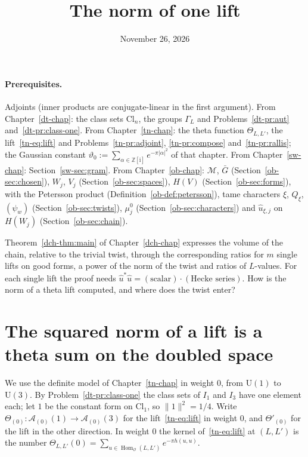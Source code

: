 \documentclass[reqno]{amsart}
\title{The norm of one lift}
\author{}
\date{November 26, 2026}
\newcounter{chap}
\theoremstyle{definition}
\theoremstyle{plain}
\newcommand{\Z}{\mathbb{Z}}
\newcommand{\ii}{\mathrm{i}}
\newcommand{\Oc}{\mathcal{O}}
\newcommand{\Ac}{\mathcal{A}}
\newcommand{\Mch}{\mathcal{M}}
\newcommand{\Cl}{\mathrm{Cl}}
\newcommand{\U}{\mathrm{U}}
\newcommand{\Hom}{\operatorname{Hom}}
\newcommand{\uh}{\hat u}
\begin{document}
\maketitle
{}\label{chap}

\paragraph{Prerequisites.}
Adjoints (inner products are conjugate-linear in the first argument).  From Chapter~\ref{dt-chap}: the class sets \(\Cl_n\), the groups \(\Gamma_L\) and Problems~\ref{dt-pr:aut} and~\ref{dt-pr:class-one}.  From Chapter~\ref{tn-chap}: the theta function \(\Theta_{L,L'}\), the lift~\eqref{tn-eq:lift} and Problems~\ref{tn-pr:adjoint}, \ref{tn-pr:compose} and~\ref{tn-pr:rallis}; the Gaussian constant \(\vartheta_0 := \sum_{\alpha \in \Z[\ii]} e^{-\pi\lvert\alpha\rvert^2}\) of that chapter.  From Chapter~\ref{sw-chap}: Section~\ref{sw-sec:gram}.  From Chapter~\ref{ob-chap}: \(\Mch\), \(\bar G\) (Section~\ref{ob-sec:chosen}), \(W_j\), \(V_j\) (Section~\ref{ob-sec:spaces}), \(H(V)\) (Section~\ref{ob-sec:forms}), with the Petersson product (Definition~\ref{ob-def:petersson}), tame characters \(\xi\), \(Q_\xi\), \((\psi_w)\) (Section~\ref{ob-sec:twists}), \(\mu_j^0\) (Section~\ref{ob-sec:characters}) and \(\uh_{\xi,j}\) on \(H(W_j)\) (Section~\ref{ob-sec:chain}).

\medskip
Theorem~\ref{dch-thm:main} of Chapter~\ref{dch-chap} expresses the volume of the chain, relative to the trivial twist, through the corresponding ratios for \(m\) single lifts on good forms, a power of the norm of the twist and ratios of \(L\)-values.  For each single lift the proof needs \(\uh^*\uh = (\text{scalar}) \cdot (\text{Hecke series})\).  How is the norm of a theta lift computed, and where does the twist enter?

\section{The squared norm of a lift is a theta sum on the doubled space}\label{sec:doubled}

We use the definite model of Chapter~\ref{tn-chap} in weight \(0\), from \(\U(1)\) to \(\U(3)\).  By Problem~\ref{dt-pr:class-one} the class sets of \(I_1\) and \(I_3\) have one element each; let \(1\) be the constant form on \(\Cl_1\), so \(\lVert 1\rVert^2 = 1/4\).  Write \(\Theta_{(0)} \colon \Ac_{(0)}(1) \to \Ac_{(0)}(3)\) for the lift~\eqref{tn-eq:lift} in weight \(0\), and \(\Theta'_{(0)}\) for the lift in the other direction.  In weight \(0\) the kernel of~\eqref{tn-eq:lift} at \((L, L')\) is the number \(\Theta_{L,L'}(0) = \sum_{u \in \Hom_\Oc(L, L')} e^{-\pi h(u,u)}\).
\end{document}
